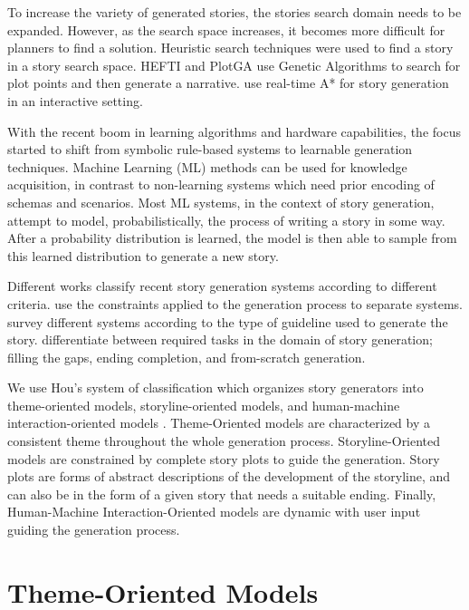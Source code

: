 To increase the variety of generated stories, the stories search domain needs to be expanded. However, as the search space increases, it becomes more difficult for planners to find a solution. Heuristic search techniques were used to find a story in a story search space. HEFTI \citep{ong2004genetic} and PlotGA \citep{mcintyre2010plot} use Genetic Algorithms to search for plot points and then generate a narrative. \citep{cavazza2009emotional} use real-time A* for story generation in an interactive setting.

With the recent boom in learning algorithms and hardware capabilities, the focus started to shift from symbolic rule-based systems to learnable generation techniques. Machine Learning (ML) methods can be used for knowledge acquisition, in contrast to non-learning systems which need prior encoding of schemas and scenarios. Most ML systems, in the context of story generation, attempt to model, probabilistically, the process of writing a story in some way. After a probability distribution is learned, the model is then able to sample from this learned distribution to generate a new story.

Different works classify recent story generation systems according to different criteria. \citep{hou2019survey} use the constraints applied to the generation process to separate systems. \citep{herrera2020automatic} survey different systems according to the type of guideline used to generate the story. \citep{alhussain2021automatic} differentiate between required tasks in the domain of story generation; filling the gaps, ending completion, and from-scratch generation.

We use Hou's system of classification which organizes story generators into theme-oriented models, storyline-oriented models, and human-machine interaction-oriented models \citep{hou2019survey}. Theme-Oriented models are characterized by a consistent theme throughout the whole generation process. Storyline-Oriented models are constrained by complete story plots to guide the generation. Story plots are forms of abstract descriptions of the development of the storyline, and can also be in the form of a given story that needs a suitable ending. Finally, Human-Machine Interaction-Oriented models are dynamic with user input guiding the generation process.



\section{Theme-Oriented Models}
\label{sec:theme_models}

